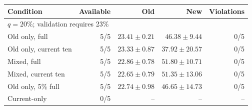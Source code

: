 \begin{tabular}{lrrrr}
\toprule
Condition & Available & Old & New & Violations\\
\midrule
\multicolumn{5}{l}{$q=20\%$; validation requires 23\%}\\
Old only, full & 5/5 & $23.41\pm0.21$ & $46.38\pm9.44$ & 0/5\\
Old only, current ten & 5/5 & $23.33\pm0.87$ & $37.92\pm20.57$ & 0/5\\
Mixed, full & 5/5 & $22.86\pm0.78$ & $51.80\pm10.71$ & 0/5\\
Mixed, current ten & 5/5 & $22.65\pm0.79$ & $51.35\pm13.06$ & 0/5\\
Old only, 5\% full & 5/5 & $22.74\pm0.98$ & $46.65\pm14.73$ & 0/5\\
Current-only & 0/5 & -- & -- & --\\
\bottomrule
\end{tabular}
